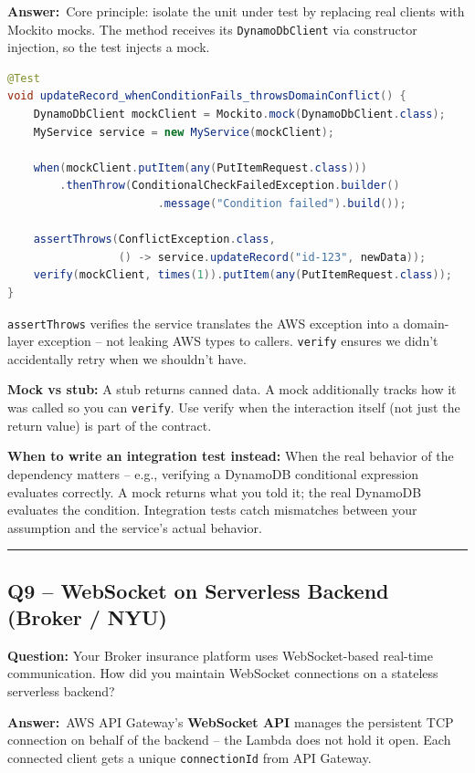 \documentclass[letterpaper,10pt]{article}
\newlength{\boxwidth}
\newcommand{\questionbox}[1]{%
  \vspace{6pt}%
  \noindent\colorbox{qbg}{%
    \begin{minipage}{\boxwidth}%
      \vspace{3pt}\textbf{\textcolor{nordblue}{Question:}} #1\vspace{3pt}%
    \end{minipage}%
  }\vspace{2pt}%
}
\newcommand{\answerlabel}{\noindent\textbf{\textcolor{answerblue}{Answer:}}~}
\begin{document}
\answerlabel Core principle: isolate the unit under test by replacing real clients with Mockito mocks. The method receives its \texttt{DynamoDbClient} via constructor injection, so the test injects a mock.

\begin{lstlisting}[language=Java]
@Test
void updateRecord_whenConditionFails_throwsDomainConflict() {
    DynamoDbClient mockClient = Mockito.mock(DynamoDbClient.class);
    MyService service = new MyService(mockClient);

    when(mockClient.putItem(any(PutItemRequest.class)))
        .thenThrow(ConditionalCheckFailedException.builder()
                       .message("Condition failed").build());

    assertThrows(ConflictException.class,
                 () -> service.updateRecord("id-123", newData));
    verify(mockClient, times(1)).putItem(any(PutItemRequest.class));
}
\end{lstlisting}

\texttt{assertThrows} verifies the service translates the AWS exception into a domain-layer exception -- not leaking AWS types to callers. \texttt{verify} ensures we didn't accidentally retry when we shouldn't have.

\textbf{Mock vs stub:} A stub returns canned data. A mock additionally tracks how it was called so you can \texttt{verify}. Use verify when the interaction itself (not just the return value) is part of the contract.

\textbf{When to write an integration test instead:} When the real behavior of the dependency matters -- e.g., verifying a DynamoDB conditional expression evaluates correctly. A mock returns what you told it; the real DynamoDB evaluates the condition. Integration tests catch mismatches between your assumption and the service's actual behavior.

\medskip\rule{\linewidth}{0.2pt}

\subsection*{Q9 -- WebSocket on Serverless Backend (Broker / NYU)}

\questionbox{Your Broker insurance platform uses WebSocket-based real-time communication. How did you maintain WebSocket connections on a stateless serverless backend?}

\answerlabel AWS API Gateway's \textbf{WebSocket API} manages the persistent TCP connection on behalf of the backend -- the Lambda does not hold it open. Each connected client gets a unique \texttt{connectionId} from API Gateway.
\end{document}
